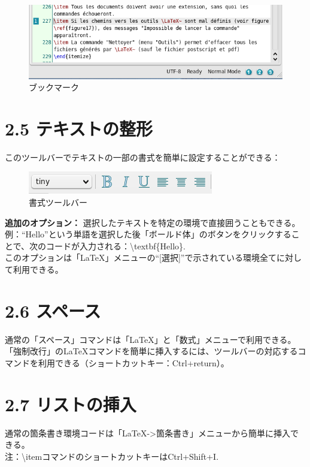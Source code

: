 \documentclass[]{book}
\makeatletter
\def\maxwidth{\ifdim\Gin@nat@width>\linewidth\linewidth
\else\Gin@nat@width\fi}
\let\Oldincludegraphics\includegraphics
\renewcommand{\includegraphics}[1]{\Oldincludegraphics[width=\maxwidth]{#1}}
\makeatother
\begin{document}
\begin{figure}[htbp]
\centering
\includegraphics{doc20.png}
\caption{ブックマーク}
\end{figure}

\section{2.5 テキストの整形}

このツールバーでテキストの一部の書式を簡単に設定することができる：

\begin{figure}[htbp]
\centering
\includegraphics{doc6.png}
\caption{書式ツールバー}
\end{figure}

\textbf{追加のオプション：}
選択したテキストを特定の環境で直接囲うこともできる。
例：``Hello''という単語を選択した後「ボールド体」のボタンをクリックすることで、次のコードが入力される：\textbackslash{}textbf\{Hello\}.\\
このオプションは「LaTeX」メニューの``{[}選択{]}''で示されている環境全てに対して利用できる。

\section{2.6 スペース}

通常の「スペース」コマンドは「LaTeX」と「数式」メニューで利用できる。
「強制改行」のLaTeXコマンドを簡単に挿入するには、ツールバーの対応するコマンドを利用できる（ショートカットキー：Ctrl+return）。

\section{2.7 リストの挿入}

通常の箇条書き環境コードは「LaTeX-\textgreater{}箇条書き」メニューから簡単に挿入できる。\\
注：\textbackslash{}itemコマンドのショートカットキーはCtrl+Shift+I.
\end{document}

